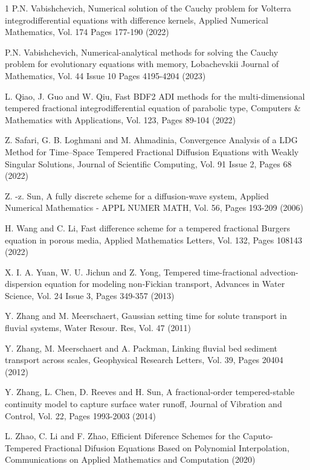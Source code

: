 \documentclass[10pt, reqno]{amsart}
\theoremstyle{remark}
\theoremstyle{definition}
\numberwithin{table}{section}
\begin{document}
\begin{thebibliography}{1}
P.N. Vabishchevich, Numerical solution of the Cauchy problem for Volterra integrodifferential equations with difference kernels, Applied Numerical Mathematics, Vol. 174 Pages 177-190 (2022)

P.N. Vabishchevich, Numerical-analytical methods for solving the Cauchy problem for evolutionary equations with memory, Lobachevskii Journal of Mathematics, Vol. 44 Issue 10 Pages 4195-4204 (2023)

L.  Qiao,  J.  Guo and W.  Qiu,  Fast BDF2 ADI methods for the multi-dimensional tempered fractional integrodifferential equation of parabolic type,  Computers \& Mathematics with Applications,  Vol.  123,  Pages 89-104 (2022)

Z.  Safari,  G.  B.  Loghmani and M.  Ahmadinia,  Convergence Analysis of a LDG Method for Time–Space Tempered Fractional Diffusion Equations with Weakly Singular Solutions,  Journal of Scientific Computing,  Vol.  91 Issue 2,  Pages 68 (2022)

Z. -z.  Sun,  A fully discrete scheme for a diffusion-wave system,  Applied Numerical Mathematics - APPL NUMER MATH,  Vol.  56,  Pages 193-209 (2006)

H.  Wang and C.  Li,  Fast difference scheme for a tempered fractional Burgers equation in porous media,  Applied Mathematics Letters,  Vol.  132,  Pages 108143 (2022)

X.  I.  A.  Yuan,  W.  U.  Jichun and Z.  Yong,  Tempered time-fractional advection-dispersion equation for modeling non-Fickian transport,  Advances in Water Science,  Vol.  24 Issue 3,  Pages 349-357 (2013)

Y.  Zhang and M.  Meerschaert,  Gaussian setting time for solute transport in fluvial systems,  Water Resour.  Res,  Vol.  47 (2011)

Y.  Zhang,  M.  Meerschaert and A.  Packman,  Linking fluvial bed sediment transport across scales,  Geophysical Research Letters,  Vol.  39,  Pages 20404 (2012)

Y.  Zhang,  L.  Chen,  D.  Reeves and H.  Sun,  A fractional-order tempered-stable continuity model to capture surface water runoff,  Journal of Vibration and Control,  Vol.  22,  Pages 1993-2003 (2014)

L.  Zhao,  C.  Li and F.  Zhao,  Efficient Diference Schemes for the Caputo-Tempered Fractional Difusion Equations Based on Polynomial Interpolation,  Communications on Applied Mathematics and Computation (2020)


\end{thebibliography}
\end{document}
